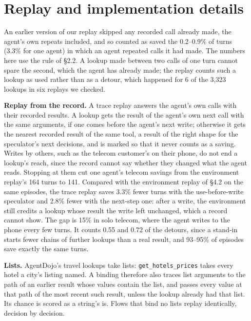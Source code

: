 \documentclass[10pt,twocolumn,letterpaper]{article}
\newcommand{\runin}[1]{{\sffamily\bfseries\color{accent}#1}}
\begin{document}
\hypertarget{replay-and-implementation-details}{%
\section{Replay and implementation details}\label{replay-and-implementation-details}}

An earlier version of our replay skipped any recorded call already made, the agent's own repeats included, and so counted as saved the 0.2--0.9\% of turns (3.3\% for one agent) in which an agent repeated calls it had made. The numbers here use the rule of §2.2. A lookup made between two calls of one turn cannot spare the second, which the agent has already made; the replay counts such a lookup as used rather than as a detour, which happened for 6 of the 3,323 lookups in six replays we checked.

\runin{Replay from the record.} A trace replay answers the agent's own calls with their recorded results. A lookup gets the result of the agent's own next call with the same arguments, if one comes before the agent's next write; otherwise it gets the nearest recorded result of the same tool, a result of the right shape for the speculator's next decisions, and is marked so that it never counts as a saving. Writes by others, such as the telecom customer's on their phone, do not end a lookup's reach, since the record cannot say whether they changed what the agent reads. Stopping at them cut one agent's telecom savings from the environment replay's 164 turns to 141. Compared with the environment replay of §4.2 on the same episodes, the trace replay saves 3.3\% fewer turns with the use-before-write speculator and 2.8\% fewer with the next-step one: after a write, the environment still credits a lookup whose result the write left unchanged, which a record cannot show. The gap is 15\% in solo telecom, where the agent writes to the phone every few turns. It counts 0.55 and 0.72 of the detours, since a stand-in starts fewer chains of further lookups than a real result, and 93--95\% of episodes save exactly the same turns.

\runin{Lists.} AgentDojo's travel lookups take lists: \texttt{get\_hotels\_prices} takes every hotel a city's listing named. A binding therefore also traces list arguments to the path of an earlier result whose values contain the list, and passes every value at that path of the most recent such result, unless the lookup already had that list. Its chance is scored as a string's is. Flows that bind no lists replay identically, decision by decision.
\end{document}
